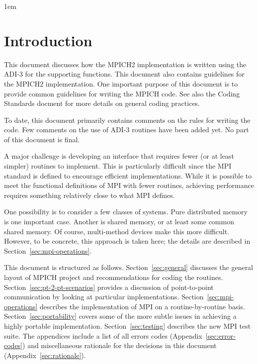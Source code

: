 \documentclass{article}
\begin{document}


{}

\clearpage

\tableofcontents
\clearpage


\raggedright
\parindent 1em
\pagestyle{headings}

\section{Introduction}
This document discusses how the MPICH2 implementation is written using
the ADI-3 \cite{adi3man} for the supporting functions.  This document
also contains guidelines for the MPICH2 implementation.  One important
purpose of this document is to provide common guidelines for writing
the MPICH code. 
See also the Coding Standards docment \cite{coding-standards} for more
details on general coding practices.

To date, this document primarily contains comments on the rules for
writing the code.  Few comments on the use of ADI-3 routines have been
added yet.  No part of this document is final.

A major challenge is developing an interface that requires fewer (or
at least simpler) routines to implement.  This is particularly
difficult since the MPI standard is defined to encourage efficient
implementations.  While it is possible to meet the functional
definitions of MPI with fewer routines, achieving performance requires
something relatively close to what MPI defines.

One possibility is to consider a few classes of systems.  Pure
distributed memory is one important case.  Another is shared memory,
or at least some common shared memory.  Of course, multi-method
devices make this more difficult.  However, to be concrete, this
approach is taken here; the details are described in
Section~\ref{sec:mpi-operations}.

This document is structured as follows.  Section~\ref{sec:general} discusses
the general layout of MPICH project and recommendations for coding the
routines.  Section~\ref{sec:pt-2-pt-scenarios} provides a discussion of
point-to-point communication by looking at particular implementations.
Section~\ref{sec:mpi-operations} describes the implementation of
MPI on a routine-by-routine basis.  Section~\ref{sec:portability} covers some
of the more subtle issues in achieving a highly portable implementation.
Section~\ref{sec:testing} describes the new MPI test suite.  The appendices
include a list of all errors codes (Appendix~\ref{sec:error-codes}) and
miscellaneous rationale for the decisions in this document
(Appendix~\ref{sec:rationale}). 
\end{document}
